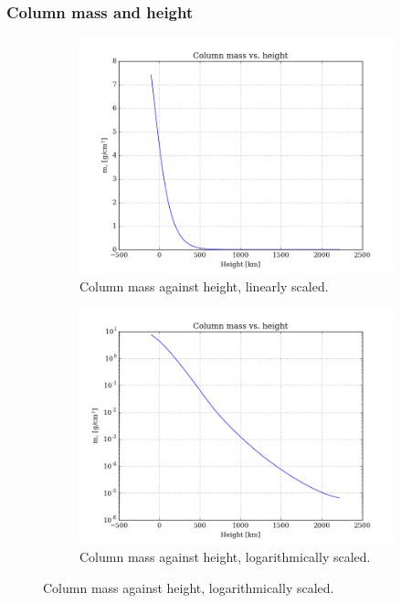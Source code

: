 \documentclass[11pt,a4paper,notitlepage]{article}
\begin{document}
\subsubsection{Column mass and height}

\begin{figure}[H]
\center

	\begin{subfigure}[t]{0.49\textwidth}
	\includegraphics[scale=0.42]{../figs/colm_vs_h.png}
	\caption{Column mass against height, linearly scaled.}
	\end{subfigure}
	\hfill	
	\begin{subfigure}[t]{0.49\textwidth}
	\includegraphics[scale=0.42]{../figs/colm_vs_h_log.png}
	\caption{Column mass against height, logarithmically scaled.}
	\end{subfigure}
	

\end{figure}
\end{document}
